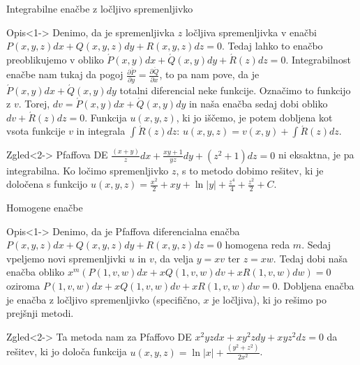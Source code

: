 \documentclass[t, 8pt]{beamer} %
\newcommand{\abs}[1]{\ensuremath{\lvert #1 \rvert}}
\newcommand{\fillblack}[1]{
	\begin{tikzpicture}[remember picture, overlay]
		\node [shift={(0 cm,0cm)}]  at (current page.south west)
		{%
			\begin{tikzpicture}[remember picture, overlay] at (current page.south west)
				\draw [fill=black] (0, 0) -- (0,#1 \paperheight) --
				(\paperwidth,#1 \paperheight) -- (\paperwidth,0) -- cycle ;
			\end{tikzpicture}
		};
		\draw (current page.north west) rectangle (current page.south east);
	\end{tikzpicture}
}
\begin{document}
		\begin{frame}{Integrabilne enačbe z ločljivo spremenljivko}
			\begin{block}{Opis}<1->
				Denimo, da je spremenljivka $z$ ločljiva spremenljivka v enačbi $P(x, y, z)dx + Q(x, y, z)dy + R(x, y, z)dz = 0$. Tedaj lahko to enačbo preoblikujemo v obliko $\acute{P}(x, y)dx + \acute{Q}(x, y)dy + \acute{R}(z)dz = 0$. Integrabilnost enačbe nam tukaj da pogoj $\frac{\partial \acute{P}}{\partial y} = \frac{\partial \acute{Q}}{\partial x}$, to pa nam pove, da je $\acute{P}(x, y)dx + \acute{Q}(x, y)dy$ totalni diferencial neke funkcije. Označimo to funkcijo z $v$. Torej, $dv = \acute{P}(x, y)dx + \acute{Q}(x, y)dy$ in naša enačba sedaj dobi obliko $dv + \acute{R}(z)dz = 0$. Funkcija $u(x, y, z)$, ki jo iščemo, je potem dobljena kot vsota funkcije $v$ in integrala $\int \acute{R}(z)dz$: $u(x, y, z) = v(x, y) + \int \acute{R}(z)dz$.
			\end{block}
			\begin{block}{Zgled}<2->
				Pfaffova DE $\frac{(x+y)}{z}dx + \frac{xy+1}{yz}dy + (z^2 + 1)dz = 0$ ni eksaktna, je pa integrabilna. Ko ločimo spremenljivko $z$, s to metodo dobimo rešitev, ki je določena s funkcijo $u(x, y, z) = \frac{x^2}{2} + xy + \ln|y| + \frac{z^4}{4} + \frac{z^2}{2} + C$.
			\end{block}
		\end{frame}
		
		\begin{frame}{Homogene enačbe}
			\begin{block}{Opis}<1->
					Denimo, da je Pfaffova diferencialna enačba $P(x, y, z)dx + Q(x, y, z)dy + R(x, y, z)dz = 0$ homogena reda $m$. Sedaj vpeljemo novi spremenljivki $u$ in $v$, da velja $y = xv$ ter $z = xw$. Tedaj dobi naša enačba obliko $x^m(P(1, v, w)dx + xQ(1, v, w)dv + xR(1, v, w)dw) = 0$ oziroma $P(1, v, w)dx + xQ(1, v, w)dv + xR(1, v, w)dw = 0$. Dobljena enačba je enačba z ločljivo spremenljivko (specifično, $x$ je ločljiva), ki jo rešimo po prejšnji metodi.
			\end{block}
			\begin{block}{Zgled}<2->
				 Ta metoda nam za Pfaffovo DE $x^2yzdx + xy^2zdy + xyz^2dz = 0$ da rešitev, ki jo določa funkcija $u(x, y, z) = \ln\abs{x} + \frac{(y^2 + z^2)}{2x^2}$.
			\end{block}
		\end{frame}
		
\end{document}
